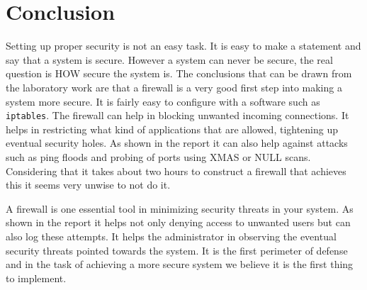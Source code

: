 \section{Conclusion} 
\label{sec:conclusion}
Setting up proper security is not an easy task. It is easy to make a statement and say that a system is secure. However a system can never be secure, the real question is HOW secure the system is. The conclusions that can be drawn from the laboratory work are that a firewall is a very good first step into making a system more secure. It is fairly easy to configure with a software such as \verb;iptables;. The firewall can help in blocking unwanted incoming connections. It helps in restricting what kind of applications that are allowed, tightening up eventual security holes. As shown in the report it can also help against attacks such as ping floods and probing of ports using XMAS or NULL scans. Considering that it takes about two hours to construct a firewall that achieves this it seems very unwise to not do it.

A firewall is one essential tool in minimizing security threats in your system. As shown in the report it helps not only denying access to unwanted users but can also log these attempts. It helps the administrator in observing the eventual security threats pointed towards the system. It is the first perimeter of defense and in the task of achieving a more secure system we believe it is the first thing to implement.



